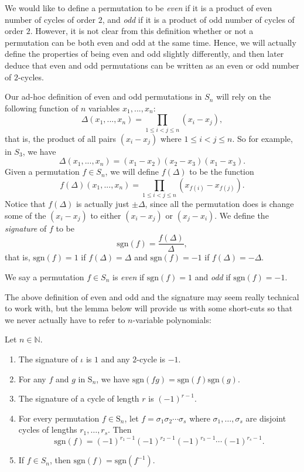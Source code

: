\documentclass[11pt,dvipsnames]{book}
\numberwithin{equation}{section} %
\numberwithin{figure}{section} %
\numberwithin{table}{section} %
\begin{document}
We would like to define a permutation to be {\it even} if it is
a product of even number of cycles of order $2$, and {\it odd} if it is a
product of odd number of cycles of order $2$. However, it is not clear from this definition whether or not a permutation can be both even and odd at the same time. Hence, we will actually define the properties of being even and odd slightly differently, and then later deduce that even and odd permutations can be written as an even or odd number of $2$-cycles.

Our ad-hoc definition of even and odd permutations in $S_{n}$ will rely on the following function of $n$ variables $x_{1},...,x_{n}$:
\[\Delta (x_{1},...,x_{n}) = \prod_{1\leq i<j\leq n} (x_{i}-x_{j}),\]
that is, the product of all pairs $(x_{i}-x_{j})$ where $1\leq i<j\leq n$. So for example, in $S_{3}$, we have 
\[\Delta (x_{1},...,x_{n}) = (x_{1}-x_{2})(x_{2}-x_{3})(x_{1}-x_{3}).\]
Given a permutation $f\in S_{n}$, we will define $f(\Delta)$ to be the function 
\[f(\Delta)(x_{1},...,x_{n})  = \prod_{1\leq i<j\leq n} (x_{f(i)}-x_{f(j)}).\]
Notice that $f(\Delta)$ is actually just $\pm \Delta$, since all the permutation does is change some of the $(x_{i}-x_{j})$ to either $(x_{i}-x_{j})$ or $(x_{j}-x_{i})$. We define the {\it signature} of $f$ to be
\[
\mbox{sgn}(f) = \frac{f(\Delta)}{\Delta},
\]
that is, $\mbox{sgn}(f) =1$ if $f(\Delta)=\Delta$ and $\mbox{sgn}(f) =-1$ if $f(\Delta)=-\Delta$. 

\begin{definition}
We say a permutation $f\in S_{n}$ is {\it even} if $\mbox{sgn}(f) =1$ and {\it odd} if  $\mbox{sgn}(f) =-1$.
\end{definition}

The above definition of even and odd and the signature may seem really technical to work with, but the lemma below will provide us with some short-cuts so that we never actually have to refer to $n$-variable polynomials:


\begin{lemma}%
Let $n\in\mathbb{N}$.
\begin{enumerate}[label=(\alph*)]
\item The signature of $\iota$ is $1$ and any $2$-cycle is $-1$. 
\item For any $f$ and $g$ in $\mathrm{S}_n$,  we have
$\mathrm{sgn}(fg)=\mathrm{sgn}(f)\mathrm{sgn}(g)$.
\item The signature of a cycle of length $r$ is $(-1)^{r-1}$.%
\item For every permutation $f\in\mathrm{S}_n$,  let $f=\sigma_{1}\sigma_{2}\cdots\sigma_{s}$
 where $\sigma_{1},\ldots,\sigma_{s}$ are disjoint cycles of
lengths $r_{1},\ldots,r_{s}$.  Then
$$
\mathrm{sgn}(f)=(-1)^{r_1-1}(-1)^{r_2-1}(-1)^{r_3-1}\cdots (-1)^{r_s-1}.%
$$

\item If $f\in S_{n}$, then $\mathrm{sgn}(f)=\mathrm{sgn}(f^{-1})$. 

\end{enumerate}
\end{lemma}
\end{document}
